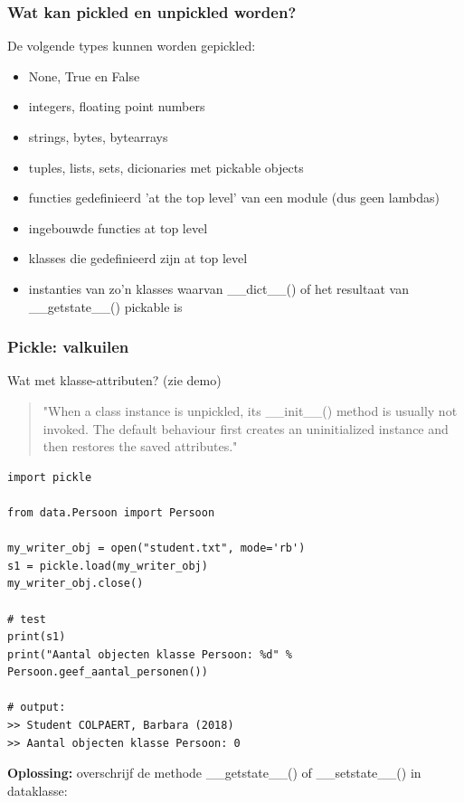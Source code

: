 \documentclass{article}
\begin{document}
\subsubsection{Wat kan pickled en unpickled worden?}

De volgende types kunnen worden gepickled:

\begin{itemize}
    \item None, True en False
    \item integers, floating point numbers
    \item strings, bytes, bytearrays
    \item tuples, lists, sets, dicionaries met pickable objects
    \item functies gedefinieerd 'at the top level' van een module (dus geen lambdas)
    \item ingebouwde functies at top level
    \item klasses die gedefinieerd zijn at top level
    \item instanties van zo'n klasses waarvan \_\_dict\_\_() of het resultaat van \_\_getstate\_\_() pickable is
\end{itemize}

\subsubsection{Pickle: valkuilen}

Wat met klasse-attributen? (zie demo)

\begin{quotation}
"When a class instance is unpickled, its \_\_init\_\_() method is usually not
invoked. The default behaviour first creates an uninitialized instance
and then restores the saved attributes."
\end{quotation}

\begin{verbatim}
import pickle

from data.Persoon import Persoon

my_writer_obj = open("student.txt", mode='rb')
s1 = pickle.load(my_writer_obj)
my_writer_obj.close()

# test
print(s1)
print("Aantal objecten klasse Persoon: %d" % Persoon.geef_aantal_personen())

# output:
>> Student COLPAERT, Barbara (2018)
>> Aantal objecten klasse Persoon: 0
\end{verbatim}

\textbf{Oplossing:} overschrijf de methode \_\_getstate\_\_() of \_\_setstate\_\_() in dataklasse:
\end{document}
